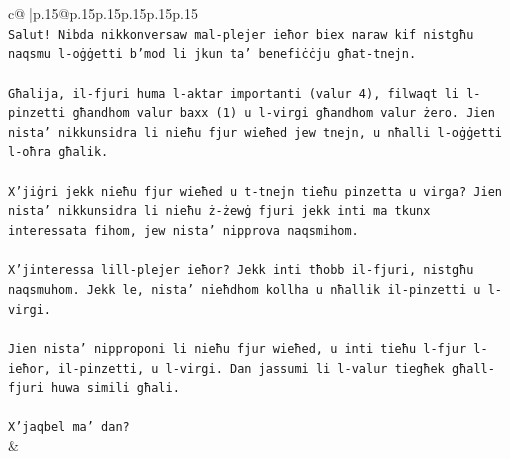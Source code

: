 \documentclass{article}
\begin{document}
{\begin{supertabular}{c@{$\;$}|p{.15\linewidth}@{}p{.15\linewidth}p{.15\linewidth}p{.15\linewidth}p{.15\linewidth}p{.15\linewidth}}
{{{\\ 
\texttt{Salut! Nibda nikkonversaw mal{-}plejer ieħor biex naraw kif nistgħu naqsmu l{-}oġġetti b'mod li jkun ta' benefiċċju għat{-}tnejn.} \\
\\ 
\texttt{Għalija, il{-}fjuri huma l{-}aktar importanti (valur 4), filwaqt li l{-}pinzetti għandhom valur baxx (1) u l{-}virgi għandhom valur żero. Jien nista' nikkunsidra li nieħu fjur wieħed jew tnejn, u nħalli l{-}oġġetti l{-}oħra għalik.} \\
\\ 
\texttt{X'jiġri jekk nieħu fjur wieħed u t{-}tnejn tieħu pinzetta u virga? Jien nista' nikkunsidra li nieħu ż{-}żewġ fjuri jekk inti ma tkunx interessata fihom, jew nista' nipprova naqsmihom.} \\
\\ 
\texttt{X'jinteressa lill{-}plejer ieħor? Jekk inti tħobb il{-}fjuri, nistgħu naqsmuhom. Jekk le, nista' nieħdhom kollha u nħallik il{-}pinzetti u l{-}virgi.} \\
\\ 
\texttt{Jien nista' nipproponi li nieħu fjur wieħed, u inti tieħu l{-}fjur l{-}ieħor, il{-}pinzetti, u l{-}virgi. Dan jassumi li l{-}valur tiegħek għall{-}fjuri huwa simili għali.} \\
\\ 
\texttt{X'jaqbel ma' dan?} \\
            }
        }
    }
    & \\ \\


\end{supertabular}}
\end{document}
